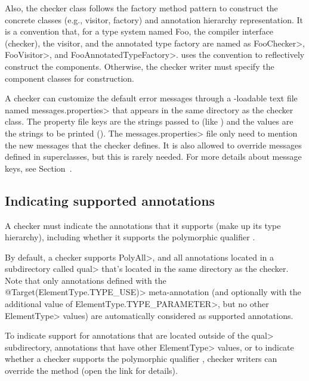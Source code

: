Also, the checker class follows the factory method pattern to
construct the concrete classes (e.g., visitor, factory) and annotation
hierarchy representation.  It is a convention that, for
a type system named Foo, the compiler
interface (checker), the visitor, and the annotated type factory are
named as \<FooChecker>, \<FooVisitor>, and \<FooAnnotatedTypeFactory>.
 uses the convention to
reflectively construct the components.  Otherwise, the checker writer
must specify the component classes for construction.

\begin{sloppypar}
A checker can customize the default error messages through a
-loadable text file named
\<messages.properties> that appears in the same directory as the checker class.
The property file keys are the strings passed to 
(like ) and the values are the strings to be
printed ().
The \<messages.properties> file only need to mention the new messages that
the checker defines.
It is also allowed to override messages defined in superclasses, but this
is rarely needed.
For more details about message keys, see Section~.
\end{sloppypar}

\subsection{Indicating supported annotations\label{indicating-supported-annotations}}

A checker must indicate the annotations that it supports (make up its type
hierarchy), including whether it supports the polymorphic qualifier
.

By default, a checker supports \<PolyAll>, and all annotations located in a
subdirectory called \<qual> that's located in the same directory as the checker.
Note that only annotations defined with the \<@Target({ElementType.TYPE\_USE})>
meta-annotation (and optionally with the additional value of
\<ElementType.TYPE\_PARAMETER>, but no other \<ElementType> values)
are automatically considered as supported annotations.

To indicate support for annotations that are located outside of the \<qual>
subdirectory, annotations that have other \<ElementType> values, or to indicate
whether a checker supports the polymorphic qualifier
, checker writers can override the
method (open the link for details).

